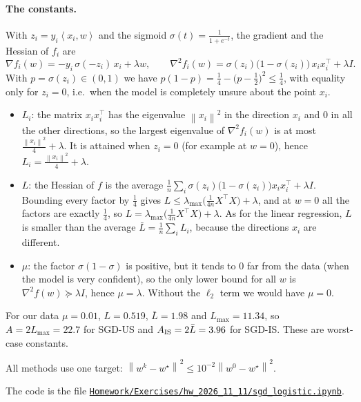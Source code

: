 \documentclass[11pt,a4paper]{article}
\newcommand{\norm}[1]{\left\| #1 \right\|}
\newcommand{\ip}[2]{\left\langle #1, #2 \right\rangle}
\begin{document}
\paragraph{The constants.} With $z_i = y_i\ip{x_i}{w}$ and the sigmoid $\sigma(t) = \frac{1}{1+e^{-t}}$, the gradient
and the Hessian of $f_i$ are
\[
  \nabla f_i(w) = -y_i\,\sigma(-z_i)\,x_i + \lambda w, \qquad
  \nabla^2 f_i(w) = \sigma(z_i)\bigl(1 - \sigma(z_i)\bigr)\,x_ix_i^\top + \lambda I .
\]
With $p = \sigma(z_i) \in (0,1)$ we have
$p(1-p) = \frac{1}{4} - \bigl(p - \frac{1}{2}\bigr)^2 \le \frac{1}{4}$, with equality only for $z_i = 0$, i.e.\ when the
model is completely unsure about the point $x_i$.
\begin{itemize}
  \item $L_i$: the matrix $x_ix_i^\top$ has the eigenvalue $\norm{x_i}^2$ in the direction $x_i$ and $0$ in all the
    other directions, so the largest eigenvalue of $\nabla^2 f_i(w)$ is at most $\frac{\norm{x_i}^2}{4} + \lambda$.
    It is attained when $z_i = 0$ (for example at $w = 0$), hence $L_i = \frac{\norm{x_i}^2}{4} + \lambda$.
  \item $L$: the Hessian of $f$ is the average $\frac{1}{n}\sum_i \sigma(z_i)\bigl(1-\sigma(z_i)\bigr)x_ix_i^\top + \lambda I$.
    Bounding every factor by $\frac{1}{4}$ gives $L \le \lambda_{\max}\bigl(\frac{1}{4n}X^\top X\bigr) + \lambda$, and at
    $w = 0$ all the factors are exactly $\frac{1}{4}$, so $L = \lambda_{\max}\bigl(\frac{1}{4n}X^\top X\bigr) + \lambda$.
    As for the linear regression, $L$ is smaller than the average $\bar L = \frac{1}{n}\sum_i L_i$, because the
    directions $x_i$ are different.
  \item $\mu$: the factor $\sigma(1-\sigma)$ is positive, but it tends to $0$ far from the data (when the model is
    very confident), so the only lower bound for all $w$ is $\nabla^2 f(w) \succeq \lambda I$, hence $\mu = \lambda$.
    Without the $\ell_2$ term we would have $\mu = 0$.
\end{itemize}
For our data $\mu = 0.01$, $L = 0.519$, $\bar L = 1.98$ and $L_{\max} = 11.34$, so $A = 2L_{\max} = 22.7$ for SGD-US
and $A_{\rm IS} = 2\bar L = 3.96$ for SGD-IS. These are worst-case constants.

All methods use one target: $\norm{w^k - w^\star}^2 \le 10^{-2}\norm{w^0 - w^\star}^2$.

The code is the file
\href{https://github.com/Gor-2001/thesis_hw/blob/main/Homework/Exercises/hw_2026_11_11/sgd_logistic.ipynb}{\texttt{Homework/Exercises/hw\_2026\_11\_11/sgd\_logistic.ipynb}}.
\end{document}
